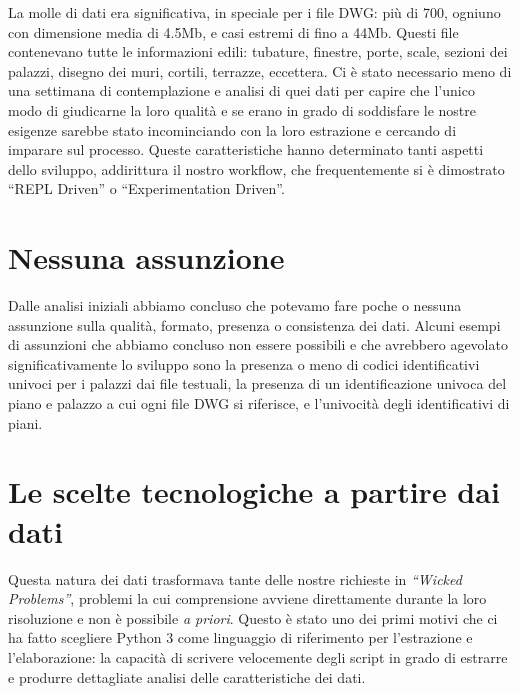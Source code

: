 \documentclass[12pt]{report}
\begin{document}
La molle di dati era significativa, in speciale per i file DWG: più di 700, ogniuno con dimensione media di 4.5Mb, e casi estremi di fino a 44Mb. Questi file contenevano tutte le informazioni edili: tubature, finestre, porte, scale, sezioni dei palazzi, disegno dei muri, cortili, terrazze, eccettera. Ci è stato necessario meno di una settimana di contemplazione e analisi di quei dati per capire che l'unico modo di giudicarne la loro qualità e se erano in grado di soddisfare le nostre esigenze sarebbe stato incominciando con la loro estrazione e cercando di imparare sul processo. Queste caratteristiche hanno determinato tanti aspetti dello sviluppo, addirittura il nostro workflow, che frequentemente si è dimostrato ``REPL Driven'' o ``Experimentation Driven''.


\section*{Nessuna assunzione}

Dalle analisi iniziali abbiamo concluso che potevamo fare poche o nessuna assunzione sulla qualità, formato, presenza o consistenza dei dati. Alcuni esempi di assunzioni che abbiamo concluso non essere possibili e che avrebbero agevolato significativamente lo sviluppo sono la presenza o meno di codici identificativi univoci per i palazzi dai file testuali, la presenza di un identificazione univoca del piano e palazzo a cui ogni file DWG si riferisce, e l'univocità degli identificativi di piani.

\section{Le scelte tecnologiche a partire dai dati}

Questa natura dei dati trasformava tante delle nostre richieste in \textit{``Wicked Problems''}, problemi la cui comprensione avviene direttamente durante la loro risoluzione e non è possibile \textit{a priori}. Questo è stato uno dei primi motivi che ci ha fatto scegliere Python 3 come linguaggio di riferimento per l'estrazione e l'elaborazione: la capacità di scrivere velocemente degli script in grado di estrarre e produrre dettagliate analisi delle caratteristiche dei dati.
\end{document}
